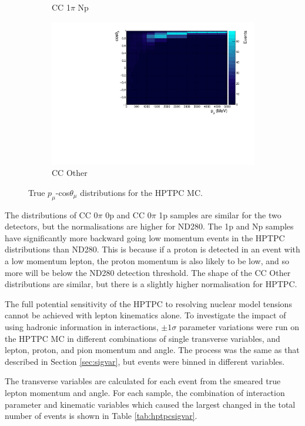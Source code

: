 \begin{figure}
\begin{subfigure}{.49\textwidth}
  \caption{CC 1$\pi$ Np}
\end{subfigure}
\begin{subfigure}{.49\textwidth}
  \centering
  \includegraphics[width=0.9\linewidth]{figs/hptpc_pmtmuu_ccOther.pdf}
  \caption{CC Other}
\end{subfigure}
\caption{True $p_{\mu}$-cos$\theta_{\mu}$ distributions for the HPTPC MC.}
\label{fig:hptpcPmuTmu}
\end{figure}

The distributions of CC 0$\pi$ 0p and CC 0$\pi$ 1p samples are similar for the two detectors, but the normalisations are higher for ND280. The 1p and Np samples have significantly more backward going low momentum events in the HPTPC distributions than ND280. This is because if a proton is detected in an event with a low momentum lepton, the proton momentum is also likely to be low, and so more will be below the ND280 detection threshold. The shape of the CC Other distributions are similar, but there is a slightly higher normalisation for HPTPC.

The full potential sensitivity of the HPTPC to resolving nuclear model tensions cannot be achieved with lepton kinematics alone. To investigate the impact of using hadronic information in interactions, $\pm1\sigma$ parameter variations were run on the HPTPC MC in different combinations of single transverse variables, and lepton, proton, and pion momentum and angle. The process was the same as that described in Section \ref{sec:sigvar}, but events were binned in different variables.

The transverse variables are calculated for each event from the smeared true lepton momentum and angle. For each sample, the combination of interaction parameter and kinematic variables which caused the largest changed in the total number of events is shown in Table \ref{tab:hptpcsigvar}. 

